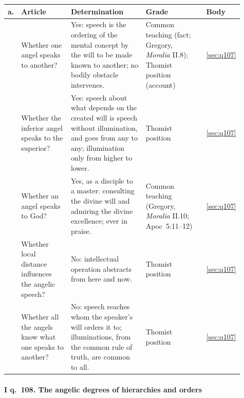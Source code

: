\begingroup\footnotesize
\begin{longtable}{>{\raggedright\arraybackslash}p{0.03\linewidth}>{\raggedright\arraybackslash}p{0.22\linewidth}>{\raggedright\arraybackslash}p{0.33\linewidth}>{\raggedright\arraybackslash}p{0.27\linewidth}>{\raggedright\arraybackslash}p{0.06\linewidth}}
\toprule
\textbf{a.} & \textbf{Article} & \textbf{Determination} & \textbf{Grade} & \textbf{Body}\\
\midrule
\endhead
1 & Whether one angel speaks to another? & Yes: speech is the ordering of the mental concept by the will to be made known to another; no bodily obstacle intervenes. & Common teaching (fact; Gregory, \emph{Moralia} II.8); Thomist position (account) & \ref{sec:q107}\\
2 & Whether the inferior angel speaks to the superior? & Yes: speech about what depends on the created will is speech without illumination, and goes from any to any; illumination only from higher to lower. & Thomist position & \ref{sec:q107}\\
3 & Whether an angel speaks to God? & Yes, as a disciple to a master: consulting the divine will and admiring the divine excellence; ever in praise. & Common teaching (Gregory, \emph{Moralia} II.10; Apoc~5:11--12) & \ref{sec:q107}\\
4 & Whether local distance influences the angelic speech? & No: intellectual operation abstracts from here and now. & Thomist position & \ref{sec:q107}\\
5 & Whether all the angels know what one speaks to another? & No: speech reaches whom the speaker's will orders it to; illuminations, from the common rule of truth, are common to all. & Thomist position & \ref{sec:q107}\\
\bottomrule
\end{longtable}
\endgroup

\paragraph{I q.~108. The angelic degrees of hierarchies and orders}

